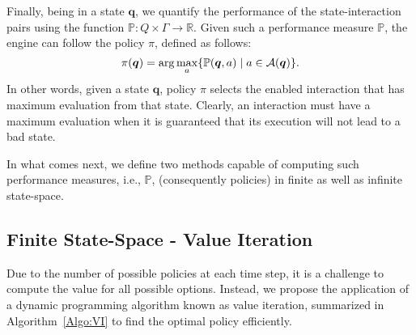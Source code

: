 
Finally, being in a state $ \bm{q}$, we quantify the performance of the state-interaction pairs using the function $\mathbb{P}: Q \times \Gamma \rightarrow \mathbb{R}$. Given such a performance measure $\mathbb{P}$, the engine can follow the policy $\pi$, defined as follows: 
\vspace*{-0.3cm}
\begin{equation}
\label{Eq:Policy}
\pi( \bm{q}) = \arg\max_{a} \{\mathbb{P}( \bm{q},a) \mid a \in {\cal A}( \bm{q})\}.
\vspace*{-0.3cm}
\end{equation}
In other words, given a state $ \bm{q}$, policy $\pi$ selects the enabled interaction that has maximum evaluation from that state. Clearly, an interaction must have a maximum evaluation when it is guaranteed that its execution will not lead to a bad state. 

In what comes next, we define two methods capable of computing such performance measures, i.e., $\mathbb{P}$,  (consequently policies) in finite as well as infinite state-space. 

\subsection{Finite State-Space - Value Iteration}
Due to the number of possible policies at each time step, it is a challenge to compute the value for all possible options. Instead, we propose the application of a dynamic programming algorithm known as value iteration, summarized in Algorithm~\ref{Algo:VI} to find the optimal policy efficiently. 

